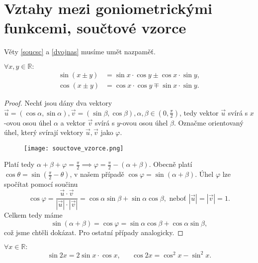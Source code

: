 \section{Vztahy mezi goniometrickými funkcemi, součtové vzorce}
\begin{pozn}
    Věty \ref{soucsc} a \ref{dvojnas}
    musíme umět nazpaměť.
\end{pozn}

\begin{veta}\label{soucsc}
    $\forall x, y \in \mathbb{R}: $
    \begin{align*}
        \sin \left(x\pm y\right) & = \sin x \cdot \cos y \pm \cos x \cdot \sin y, \\
        \cos \left(x\pm y\right) & = \cos x \cdot \cos y \mp \sin x \cdot \sin y.
    \end{align*}
\end{veta}

\begin{proof}
    Nechť jsou dány dva vektory $\vec u=(\cos \alpha, \sin \alpha), \vec v = (\sin \beta, \cos \beta), \alpha, \beta \in \left( 0,\frac{\pi}{2} \right ) $,
    tedy vektor $\vec u$ svírá s $x$-ovou osou úhel $\alpha$ a vektor $\vec v$ svírá s
    $y$-ovou osou úhel $\beta$. Označme orientovaný úhel, který svírají vektory $\vec u,\vec v$
    jako $\varphi$.
    \begin{figure}[h!]
        \centering
        \texttt{[image: souctove\_vzorce.png]}
    \end{figure}
    Platí tedy $\alpha+\beta+\varphi=\frac{\pi}{2}\implies \varphi = \frac{\pi}{2}-(\alpha+\beta)$.
    Obecně platí $\cos \theta = \sin \left ( \frac{\pi}{2}-\theta \right ) $, v našem
    případě $\cos \varphi=\sin (\alpha+\beta).$ Úhel $\varphi$ lze spočítat pomocí
    součinu
    $$\cos \varphi = \frac{\vec u\cdot \vec v}{|\vec u|\cdot |\vec v|}=\cos \alpha \sin \beta + \sin \alpha \cos \beta, \textrm{ neboť } |\vec u| = |\vec v| = 1.$$
    Celkem tedy máme
    $$\sin (\alpha+\beta) = \cos \varphi = \sin \alpha \cos \beta+\cos \alpha \sin \beta,$$
    což jsme chtěli dokázat. Pro ostatní případy analogicky.
\end{proof}

\begin{veta}\label{dvojnas}
    $ \forall x \in \mathbb{R}:$
    \begin{align*}
        \sin 2x = 2\sin x \cdot \cos x, & & \cos 2x = \cos^2 x - \sin^2 x.
    \end{align*}
\end{veta}

